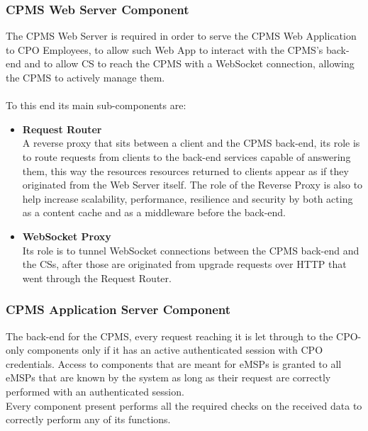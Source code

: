 \documentclass[11pt]{article}
\begin{document}
\subsubsection{CPMS Web Server Component}

The CPMS Web Server is required in order to serve the CPMS Web Application to CPO Employees, to allow such Web App to interact with the CPMS's back-end and to allow CS to reach the CPMS with a WebSocket connection, allowing the CPMS to actively manage them. \\
\\
To this end its main sub-components are:

\begin{itemize}
    \item \textbf{Request Router} \\
        A reverse proxy that sits between a client and the CPMS back-end, its role is to route requests from clients to the back-end services capable of answering them, this way the resources resources returned to clients appear as if they originated from the Web Server itself. The role of the Reverse Proxy is also to help increase scalability, performance, resilience and security by both acting as a content cache and as a middleware before the back-end.
    \item \textbf{WebSocket Proxy} \\
        Its role is to tunnel WebSocket connections between the CPMS back-end and the CSs, after those are originated from upgrade requests over HTTP that went through the Request Router.
\end{itemize}

\subsubsection{CPMS Application Server Component}

The back-end for the CPMS, every request reaching it is let through to the CPO-only components only if it has an active authenticated session with CPO credentials. Access to components that are meant for eMSPs is granted to all eMSPs that are known by the system as long as their request are correctly performed with an authenticated session. \\
Every component present performs all the required checks on the received data to correctly perform any of its functions.
\end{document}
